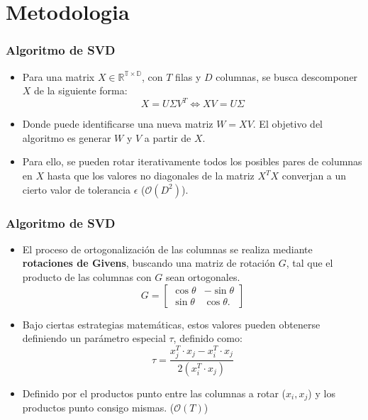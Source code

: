 
\section{Metodologia}

\begin{frame}
\frametitle{Algoritmo de SVD}

\begin{itemize}
    \item Para una matrix $X \in \mathbb{R^{T\times D}}$, con $T$ filas y $D$ columnas, se busca descomponer $X$ de la siguiente forma:
    \begin{equation}
        X = U\Sigma V^T \Leftrightarrow XV = U\Sigma
    \end{equation}
    \item Donde puede identificarse una nueva matriz $W = XV$. El objetivo del algoritmo es generar $W$ y $V$ a partir de $X$.
    \item Para ello, se pueden rotar iterativamente todos los posibles pares de columnas en $X$ hasta que los valores no diagonales de la matriz $X^TX$ converjan
    a un cierto valor de tolerancia $\epsilon$ ($\mathcal{O}(D^2)$).
\end{itemize}

\end{frame}

\begin{frame}
\frametitle{Algoritmo de SVD}
\begin{itemize}
    \item El proceso de ortogonalización de las columnas se realiza mediante \textbf{rotaciones de Givens}, buscando una matriz de rotación $G$, tal que el producto de las columnas con $G$ sean ortogonales.
    \begin{equation}
        G = \left[ 
            \begin{array}{cc}
                \cos \theta & -\sin \theta \\
                \sin \theta & \cos \theta.
            \end{array}
         \right]
    \end{equation}
    \item Bajo ciertas estrategias matemáticas, estos valores pueden obtenerse definiendo un parámetro especial $\tau$, definido como:
    \begin{equation}
    \tau = \frac{x_j^T\cdot x_j - x_i^T \cdot x_j}{2 (x_i^T \cdot x_j)}
    \end{equation}
    \item Definido por el productos punto entre las columnas a rotar ($x_i, x_j$) y los productos punto consigo mismas. ($\mathcal{O}(T)$)
\end{itemize}
\end{frame}

